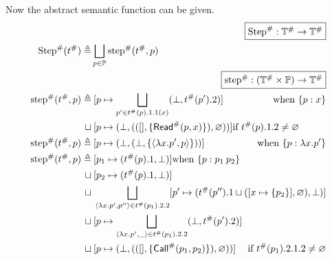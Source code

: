 Now the abstract semantic function can be given.
\begin{align*}
                                     & \pushright{\fbox{$\Abs\Step:\Abs{\mathbb{T}}\rightarrow\Abs{\mathbb{T}}$}}                                                                       \\
  \Abs\Step(\Abs\ptree)   \triangleq & \bigsqcup_{p\in\mathbb{P}}\Abs\step(\Abs\ptree,p)                                                                                                \\
                                     & \pushright{\fbox{$\Abs\step:(\Abs{\mathbb{T}}\times\mathbb{P})\rightarrow\Abs{\mathbb{T}}$}}                                                     \\
  \Abs\step(\Abs\ptree,p) \triangleq & \specialcell{\:[p\mapsto\bigsqcup_{p'\in\Abs\ptree(p).1.1(x)}(\bot,\Abs\ptree(p').2)]\hfill\text{when }\plabel{p}{x}}                            \\
  \sqcup                             & \: [p\mapsto(\bot,(([],\{\Abs\ReadE(p,x)\}),\varnothing))]\hfill\text{if }\Abs\ptree(p).1.2\neq\varnothing                                       \\
  \Abs\step(\Abs\ptree,p) \triangleq & \specialcell{\:[p\mapsto(\bot,(\bot,\{\langle\lambda x.p',p\rangle\}))]\hfill\text{when }\plabel{p}{\lambda x.p'}}                               \\
  \Abs\step(\Abs\ptree,p) \triangleq & \: [p_1\mapsto(\Abs\ptree(p).1,\bot)]\hfill\text{when }\plabel{p}{p_1\:p_2}                                                                      \\
  \sqcup                             & \: [p_2\mapsto(\Abs\ptree(p).1,\bot)]                                                                                                            \\
  \sqcup                             & \: \bigsqcup_{\langle\lambda x.p',p''\rangle\in\Abs\ptree(p_1).2.2}[p'\mapsto(\Abs\ptree(p'').1\sqcup([x\mapsto\{p_2\}],\varnothing),\bot)]      \\
  \sqcup                             & \: [p\mapsto\bigsqcup_{\langle\lambda x.p',\_\rangle\in\Abs\ptree(p_1).2.2}(\bot,\Abs\ptree(p').2)]                                              \\
  \sqcup                             & \specialcell{\:[p\mapsto(\bot,(([],\{\Abs\CallE(p_1,p_2)\}),\varnothing))]\hfill\text{if }\Abs\ptree(p_1).2.1.2\neq\varnothing}                  \\

\end{align*}

